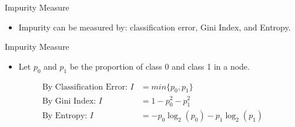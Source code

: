 \documentclass[
  ignorenonframetext,
]{beamer}
\providecommand{\tightlist}{%
  \setlength{\itemsep}{0pt}\setlength{\parskip}{0pt}}
\begin{document}
\begin{frame}{Impurity Measure}
\label{impurity-measure-2}
\begin{itemize}
\tightlist
\item
  Impurity can be measured by: classification error, Gini Index, and
  Entropy.
\end{itemize}
\end{frame}

\begin{frame}{Impurity Measure}
\label{impurity-measure-3}
\begin{itemize}
\tightlist
\item
  Let \(p_0\) and \(p_1\) be the proportion of class 0 and class 1 in a
  node.
\end{itemize}

\begin{align*}
{\text{By Classification Error: }} I &= min\{p_0, p_1\} \\
{\text{By Gini Index: }} I&= 1 - p_0^2-p_1^2 \\
{\text{By Entropy: }} I &= -p_0 \log_2(p_0)-p_1\log_2(p_1) 
\end{align*}
\end{frame}
\end{document}
